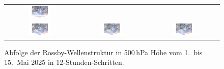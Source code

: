 \begin{figure}
\begin{tabular}{ccc}
		\includegraphics[width=0.32\textwidth, trim=3.1cm 3cm 3.0cm 0.8cm, clip]{papers/rossby/images/data_2025_5_3_12_00_500.pdf}   \\
		\includegraphics[width=0.32\textwidth, trim=3.1cm 3cm 3.0cm 0.8cm, clip]{papers/rossby/images/data_2025_5_4_00_00_500.pdf} &
		\includegraphics[width=0.32\textwidth, trim=3.1cm 3cm 3.0cm 0.8cm, clip]{papers/rossby/images/data_2025_5_4_12_00_500.pdf} &
		\includegraphics[width=0.32\textwidth, trim=3.1cm 3cm 3.0cm 0.8cm, clip]{papers/rossby/images/data_2025_5_5_00_00_500.pdf}   \\
	\end{tabular}
	\caption{Abfolge der Rossby-Wellenstruktur in 500\,hPa Höhe vom 1.\ bis 15.\ Mai 2025 in 12-Stunden-Schritten.}
	\label{fig:rossby_grid}
\end{figure}

